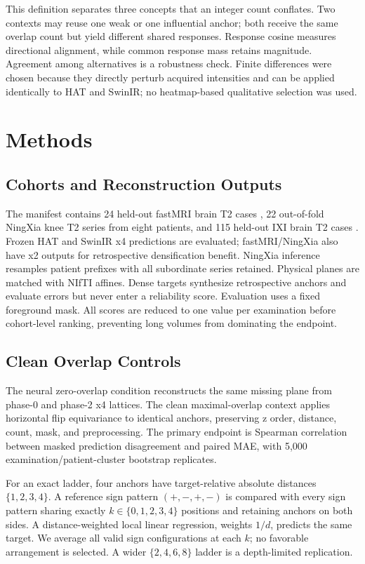 \documentclass[10pt,twocolumn,letterpaper]{article}
\begin{document}
This definition separates three concepts that an integer count conflates. Two contexts may reuse one weak or one influential anchor; both receive the same overlap count but yield different shared responses. Response cosine measures directional alignment, while common response mass retains magnitude. Agreement among alternatives is a robustness check. Finite differences were chosen because they directly perturb acquired intensities and can be applied identically to HAT and SwinIR; no heatmap-based qualitative selection was used.

\section{Methods}
\subsection{Cohorts and Reconstruction Outputs}
The manifest contains 24 held-out fastMRI brain T2 cases \cite{knoll2020fastmri}, 22 out-of-fold NingXia knee T2 series from eight patients, and 115 held-out IXI brain T2 cases \cite{ixi_dataset}. Frozen HAT and SwinIR x4 predictions are evaluated; fastMRI/NingXia also have x2 outputs for retrospective densification benefit. NingXia inference resamples patient prefixes with all subordinate series retained. Physical planes are matched with NIfTI affines. Dense targets synthesize retrospective anchors and evaluate errors but never enter a reliability score. Evaluation uses a fixed foreground mask. All scores are reduced to one value per examination before cohort-level ranking, preventing long volumes from dominating the endpoint.

\subsection{Clean Overlap Controls}
The neural zero-overlap condition reconstructs the same missing plane from phase-0 and phase-2 x4 lattices. The clean maximal-overlap context applies horizontal flip equivariance to identical anchors, preserving z order, distance, count, mask, and preprocessing. The primary endpoint is Spearman correlation between masked prediction disagreement and paired MAE, with 5,000 examination/patient-cluster bootstrap replicates.

For an exact ladder, four anchors have target-relative absolute distances $\{1,2,3,4\}$. A reference sign pattern $(+,-,+,-)$ is compared with every sign pattern sharing exactly $k\in\{0,1,2,3,4\}$ positions and retaining anchors on both sides. A distance-weighted local linear regression, weights $1/d$, predicts the same target. We average all valid sign configurations at each $k$; no favorable arrangement is selected. A wider $\{2,4,6,8\}$ ladder is a depth-limited replication.
\end{document}
